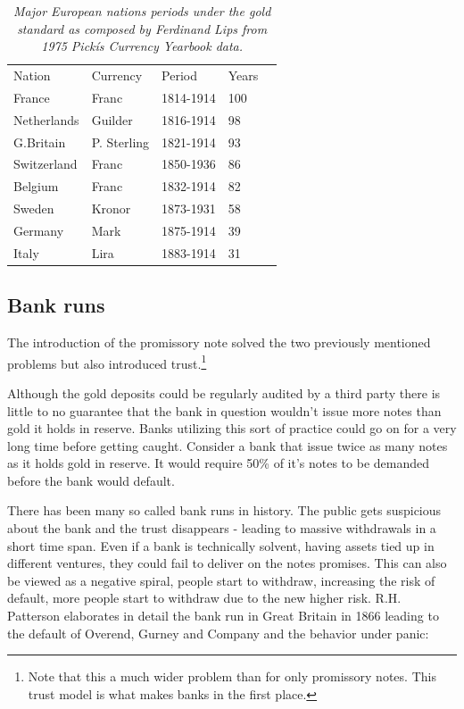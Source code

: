 \begin{table}[!htb]
	\begin{tabular}{lllll}
		Nation & Currency & Period & Years \\
		France & Franc & 1814-1914 & 100 \\
		Netherlands & Guilder & 1816-1914 & 98 \\
		G.Britain & P. Sterling & 1821-1914 & 93 \\
		Switzerland & Franc & 1850-1936 & 86 \\
		Belgium & Franc & 1832-1914 & 82 \\
		Sweden & Kronor & 1873-1931 & 58 \\
		Germany & Mark & 1875-1914 & 39 \\
		Italy & Lira & 1883-1914 & 31 \\   
	\end{tabular}

	\caption{\textit{ Major European nations periods under the gold standard
			as composed by Ferdinand Lips\cite{lips:gold:wars} from 1975 Pickís Currency Yearbook data.
	}}
	\label{tab:gold:standard}
\end{table}

\subsection{Bank runs}

The introduction of the promissory note solved the two previously mentioned problems but also 
introduced trust.\footnote{Note that this a much wider problem than for only promissory notes. This trust model is what makes banks in the first place.} 

Although the gold deposits could be regularly audited by a third party there is little to no guarantee that the bank in question wouldn't issue more notes than gold it holds in reserve. Banks utilizing this sort of practice could go on for a very long time before getting caught. Consider a bank that issue twice as many notes as it holds gold in reserve. It would require 50\% of it's notes to be demanded before the bank would default.  
  
There has been many so called bank runs in history. The public gets suspicious about the bank and the trust disappears - leading to massive withdrawals in a short time span. Even if a bank is technically solvent, having assets tied up in different ventures, they could fail to deliver on the notes promises. This can also be viewed as a negative spiral, people start to withdraw, increasing the risk of default, more people start to withdraw due to the new higher risk. R.H. Patterson elaborates in detail the bank run in Great Britain in 1866 leading to the default of Overend, Gurney and Company and the behavior under panic: 

